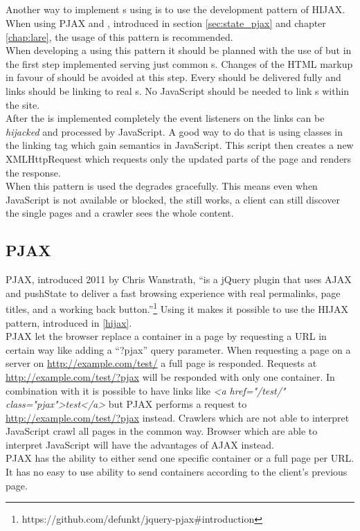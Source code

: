 \subsection{\hijax{}\label{hijax}}
Another way to implement \singlePageApplication{}s using \ajax{} is to use the development pattern of HIJAX.
When using PJAX and \lare{}, introduced in section \ref{sec:state_pjax} and chapter \ref{chap:lare}, the usage of this pattern is recommended.
\\
When developing a \webSite{} using this pattern it should be planned with the use of \ajax{} but in the first step implemented serving just common \httpRequest{}s.
Changes of the HTML markup in favour of \ajax{} should be avoided at this step.
Every \webPage{} should be delivered fully and links should be linking to real \webPage{}s.
No JavaScript should be needed to link \webPage{}s within the site.
\\
After the \webSite{} is implemented completely the event listeners on the links can be \emph{hijacked} and processed by JavaScript.
A good way to do that is using classes in the linking tag which gain semantics in JavaScript.
This script then creates a new XMLHttpRequest which requests only the updated parts of the page and renders the response.
\\
When this pattern is used the \webSite{} degrades gracefully.
This means even when JavaScript is not available or blocked, the \webSite{} still works, a client can still discover the single pages and a crawler sees the whole content.

\subsection{PJAX\label{sec:state_pjax}}
PJAX, introduced 2011 by Chris Wanstrath, \enquote{is a jQuery plugin that uses AJAX and pushState to deliver a fast browsing experience with real permalinks, page titles, and a working back button.}\footnote{https://github.com/defunkt/jquery-pjax\#introduction}
Using it makes it possible to use the HIJAX pattern, introduced in \ref{hijax}.
\\
PJAX let the browser replace a container in a page by requesting a URL in certain way like adding a \enquote{?pjax} query parameter.
When requesting a page on a server on \url{http://example.com/test/} a full page is responded.
Requests at \url{http://example.com/test/?pjax} will be responded with only one container.
In combination with \hijax{} it is possible to have links like \emph{<a href="/test/" class="pjax">test</a>} but PJAX performs a request to \url{http://example.com/test/?pjax} instead.
Crawlers which are not able to interpret JavaScript crawl all pages in the common way.
Browser which are able to interpret JavaScript will have the advantages of AJAX instead.
\\
PJAX has the ability to either send one specific container or a full page per URL. It has no easy to use ability to send containers according to the client's previous page.
